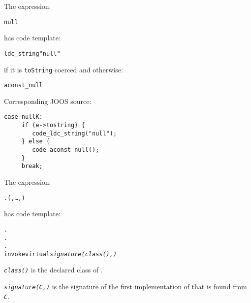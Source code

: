 \begin{slide*}
The expression:
 
\begin{scriptsize}
\begin{alltt}
    null
\end{alltt}
\end{scriptsize}
 
has code template:
 
\begin{scriptsize}
\begin{alltt}
    ldc_string "null"
\end{alltt}
\end{scriptsize}

if it is {\tt toString} coerced and otherwise:

\begin{scriptsize}
\begin{alltt}
    aconst_null
\end{alltt}
\end{scriptsize}

Corresponding JOOS source:
 
\begin{scriptsize}
\begin{verbatim}
case nullK:
     if (e->tostring) {
        code_ldc_string("null");
     } else {
        code_aconst_null();
     }
     break;
\end{verbatim}
\end{scriptsize}

\vfil
\end{slide*}
 
\begin{slide*}
The expression:

\begin{scriptsize}
\begin{alltt}
    .(,\ldots,)
\end{alltt}
\end{scriptsize}
 
has code template:
 
\begin{scriptsize}
\begin{alltt}
    .
    .
    .
    invokevirtual {\em signature(class(),)}

\end{alltt}
\end{scriptsize}

{\tt\em class()} is the declared class of .

{\tt\em signature(C,)} is the signature of the first implementation
of  that is found from {\tt\em C}.
\vfil
\end{slide*}

